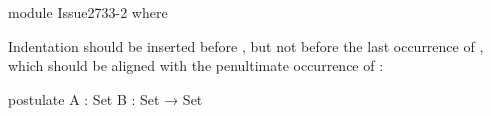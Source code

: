 \documentclass{article}
\begin{document}
\begin{AgdaAlign}
\begin{code}
module Issue2733-2 where
\end{code}

Indentation should be inserted before , but not
before the last occurrence of , which should be
aligned with the penultimate occurrence of :
\begin{code}
  postulate
    A  : Set
    B  : Set →
         Set
\end{code}
\end{AgdaAlign}
\end{document}
